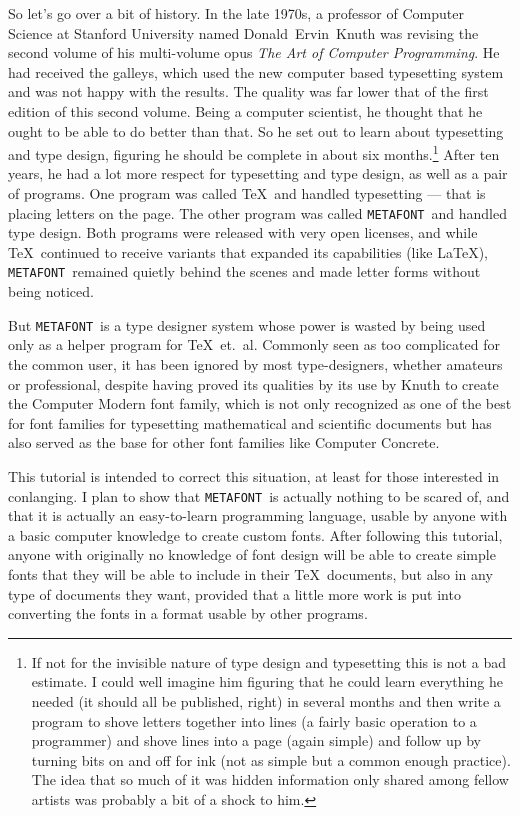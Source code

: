 \documentclass[a4paper,11pt,twoside]{book}
\newcommand{\MF}{{\tt METAFONT}}
\begin{document}
So let's go over a bit of history.
In the late 1970s, a professor of Computer Science at Stanford University named Donald~Ervin~Knuth
was revising the second volume of his multi-volume opus \textsl{The Art of Computer Programming}.
He had received the galleys, which used the new computer based typesetting system and was not
happy with the results.
The quality was far lower that of the first edition of this second volume.
Being a computer scientist, he thought that he ought to be able to do better than that.
So he set out to learn about typesetting and type design, figuring he should be complete in about
six months.\footnote{If not for the invisible nature of type design and typesetting this is not a
bad estimate.
I could well imagine him figuring that he could learn everything he needed (it should all be
published, right) in several months and then write a program to shove letters together into lines
(a fairly basic operation to a programmer) and shove lines into a page (again simple) and follow
up by turning bits on and off for ink (not as simple but a common enough practice).
The idea that so much of it was hidden information only shared among fellow artists was probably
a bit of a shock to him.}
After ten years, he had a lot more respect for typesetting and type design, as well as a pair of
programs.
One program was called \TeX\ and handled typesetting --- that is placing letters on the page.
The other program was called \MF\ and handled type design.
Both programs were released with very open licenses, and while \TeX\ continued to receive variants
that expanded its capabilities (like \LaTeX), \MF\ remained quietly behind the scenes and made
letter forms without being noticed.

But \MF\ is a type designer system whose power is wasted by being used only as a helper program
for \TeX\ et.~al.
Commonly seen as too complicated for the common user, it has been ignored by most type-designers,
whether amateurs or professional, despite having proved its qualities by its use by Knuth to
create the Computer Modern font family, which is not only recognized as one of the best for
font families for typesetting mathematical and scientific documents but has also served as the
base for other font families like Computer Concrete.

This tutorial is intended to correct this situation, at least for those interested in conlanging.
I plan to show that \MF\ is actually nothing to be scared of, and that it is actually an
easy-to-learn programming language, usable by anyone with a basic computer knowledge to create
custom fonts.
After following this tutorial, anyone with originally no knowledge of font design will be able to
create simple fonts that they will be able to include in their \TeX\ documents, but also in any
type of documents they want, provided that a little more work is put into converting the fonts in
a format usable by other programs.
\end{document}
